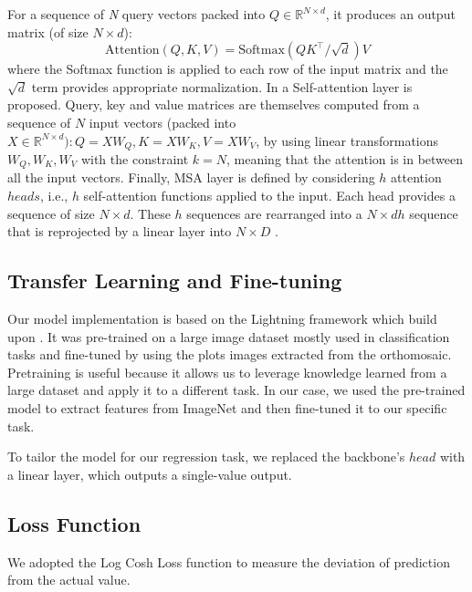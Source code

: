 For a sequence of \textit{N} query vectors packed into $Q \in \mathbb{R} ^{N \times d}$, it produces an output matrix (of size $N \times d$):
\begin{equation} \label{eq:attention} 
\text{Attention}(Q,K,V) = \text{Softmax}(QK^\intercal/\sqrt{d})V 
\end{equation}
where the Softmax function is applied to each row of the input matrix and the $\sqrt{d}$ term provides appropriate normalization. In \cite{vaswani2023attention} a Self-attention layer is proposed. Query, key and value matrices are themselves computed from a sequence of $N$ input vectors (packed into $X \in \mathbb{R} ^{N \times d}): Q = XW_{Q}, K = XW_{K}, V = XW_{V}$, by using linear transformations $W_{Q}, W_{K}, W_{V}$ with the constraint $k = N$, meaning that the attention is in between all the input vectors.
Finally, MSA layer is defined by considering $h$ attention $heads$, i.e., $h$ self-attention functions applied to the input. Each head provides a sequence of size $N \times d$.
These $h$ sequences are rearranged into a $N \times dh$ sequence that is reprojected by a linear layer into $N \times D$ \cite{touvron2021training}.

\subsection{Transfer Learning and Fine-tuning}
\label{subsec:TL-FT}

Our model implementation is based on the Lightning framework \cite{Falcon_PyTorch_Lightning_2019} which build upon \cite{paszke2019pytorch}.
It was pre-trained on a large image dataset\cite{deng2009imagenet} mostly used in classification tasks  and fine-tuned by using the plots images extracted from the orthomosaic. Pretraining is useful because it allows us to leverage knowledge learned from a large dataset and apply it to a different task.
In our case, we used the pre-trained model to extract features from ImageNet and then fine-tuned it to our specific task.

To tailor the model for our regression task, we replaced the backbone's $head$ with a linear layer, which outputs a single-value output.

\subsection{Loss Function}
\label{subsec:loss_function}


We adopted the Log Cosh Loss function \cite{moshagen2021finding} to measure the deviation of prediction from the actual value.

